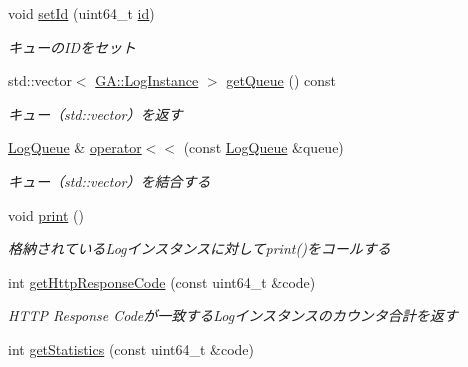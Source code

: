 \begin{DoxyCompactItemize}
void \mbox{\hyperlink{class_log_queue_a064087cf640d1803a5c17ccb34fef861}{set\+Id}} (uint64\+\_\+t \mbox{\hyperlink{class_log_queue_ab9253dce534aa882b15b6c92bc8a3056}{id}})
\begin{DoxyCompactList}\small\item\em キューの\+I\+Dをセット \end{DoxyCompactList}\item 
\mbox{\label{class_log_queue_abeff8371e74a14a8781936d04553c7b4}} 
std\+::vector$<$ \mbox{\hyperlink{class_g_a_1_1_log_instance}{G\+A\+::\+Log\+Instance}} $>$ \mbox{\hyperlink{class_log_queue_abeff8371e74a14a8781936d04553c7b4}{get\+Queue}} () const
\begin{DoxyCompactList}\small\item\em キュー（std\+::vector）を返す \end{DoxyCompactList}\item 
\mbox{\hyperlink{class_log_queue}{Log\+Queue}} \& \mbox{\hyperlink{class_log_queue_aac145e91664101348b553b437df86d2c}{operator$<$$<$}} (const \mbox{\hyperlink{class_log_queue}{Log\+Queue}} \&queue)
\begin{DoxyCompactList}\small\item\em キュー（std\+::vector）を結合する \end{DoxyCompactList}\item 
\mbox{\label{class_log_queue_a401482776cd4b1483ad5dfe99c9892e1}} 
void \mbox{\hyperlink{class_log_queue_a401482776cd4b1483ad5dfe99c9892e1}{print}} ()
\begin{DoxyCompactList}\small\item\em 格納されている\+Logインスタンスに対してprint()をコールする \end{DoxyCompactList}\item 
int \mbox{\hyperlink{class_log_queue_ac52d5613f64c2b356278b7291893e56f}{get\+Http\+Response\+Code}} (const uint64\+\_\+t \&code)
\begin{DoxyCompactList}\small\item\em H\+T\+TP Response Codeが一致する\+Logインスタンスのカウンタ合計を返す \end{DoxyCompactList}\item 
\mbox{\label{class_log_queue_a662e9b91372f9d5791b887117186dbe2}} 
int \mbox{\hyperlink{class_log_queue_a662e9b91372f9d5791b887117186dbe2}{get\+Statistics}} (const uint64\+\_\+t \&code)

\end{DoxyCompactItemize}
